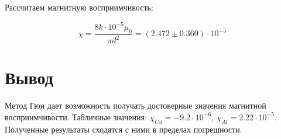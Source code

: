 \documentclass[a4paper,12pt]{article}
\begin{document}
		Рассчитаем магнитную восприимчивость:
		
		$$
		\chi = \frac{8k\cdot 10^{-5}\mu_0}{\pi d^2} = \left(2.472\pm0.360\right)\cdot 10^{-5}
		$$

	
	\section{Вывод}
	Метод Гюи дает возможность получать достоверные значения магнитной восприимчивости. Табличные значения: $\chi_{Cu} = -9.2\cdot10^{-6}$, $\chi_{Al} = 2.22\cdot 10^{-5}$. Полученные результаты сходятся с ними в пределах погрешности.
\end{document}
